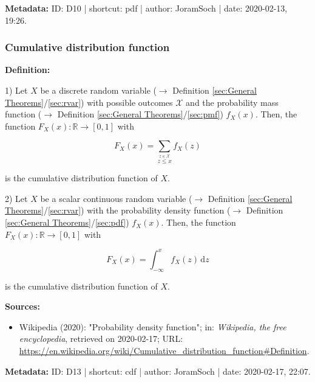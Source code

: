 \documentclass[a4paper,12pt,twoside]{book}
\begin{document}
\vspace{1em}
\textbf{Metadata:} ID: D10 | shortcut: pdf | author: JoramSoch | date: 2020-02-13, 19:26.
\vspace{1em}



\subsubsection[\textit{Cumulative distribution function}]{Cumulative distribution function} \label{sec:cdf}
\setcounter{equation}{0}

\textbf{Definition:}

1) Let $X$ be a discrete random variable ($\rightarrow$ Definition \ref{sec:General Theorems}/\ref{sec:rvar}) with possible outcomes $\mathcal{X}$ and the probability mass function ($\rightarrow$ Definition \ref{sec:General Theorems}/\ref{sec:pmf}) $f_X(x)$. Then, the function $F_X(x): \mathbb{R} \to [0,1]$ with

\begin{equation} \label{eq:cdf-cdf-disc}
F_X(x) = \sum_{\overset{z \in \mathcal{X}}{z \leq x}} f_X(z)
\end{equation}

is the cumulative distribution function of $X$.

\vspace{1em}
2) Let $X$ be a scalar continuous random variable ($\rightarrow$ Definition \ref{sec:General Theorems}/\ref{sec:rvar}) with the probability density function ($\rightarrow$ Definition \ref{sec:General Theorems}/\ref{sec:pdf}) $f_X(x)$. Then, the function $F_X(x): \mathbb{R} \to [0,1]$ with

\begin{equation} \label{eq:cdf-cdf-cont}
F_X(x) = \int_{-\infty}^{x} f_X(z) \, \mathrm{d}z
\end{equation}

is the cumulative distribution function of $X$.


\vspace{1em}
\textbf{Sources:}
\begin{itemize}
\item Wikipedia (2020): "Probability density function"; in: \textit{Wikipedia, the free encyclopedia}, retrieved on 2020-02-17; URL: \url{https://en.wikipedia.org/wiki/Cumulative_distribution_function#Definition}.
\end{itemize}


\vspace{1em}
\textbf{Metadata:} ID: D13 | shortcut: cdf | author: JoramSoch | date: 2020-02-17, 22:07.
\vspace{1em}
\end{document}
